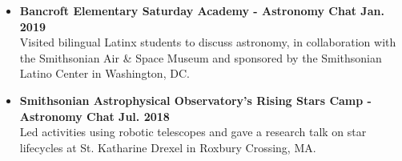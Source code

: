 \documentclass[12pt]{article}
\begin{document}
\begin{itemize}
    Engaged in \href{https://airandspace.si.edu/events/astronomy-chat-gabriella-alvarez-and-laura-vega-0}{Astronomy Chats} and Hispanic Heritage Month Outreach Familia Day in Washington, DC.
    \item \textbf{Bancroft Elementary Saturday Academy - Astronomy Chat \hfill Jan. 2019} \\
    Visited bilingual Latinx students to discuss astronomy, in collaboration with the Smithsonian Air \& Space Museum and sponsored by the Smithsonian Latino Center in Washington, DC.
    \item \textbf{Smithsonian Astrophysical Observatory's Rising Stars Camp - Astronomy Chat  \hfill Jul. 2018} \\
    Led activities using robotic telescopes and gave a research talk on star lifecycles at St. Katharine Drexel in Roxbury Crossing, MA.
\end{itemize}


\end{document}
